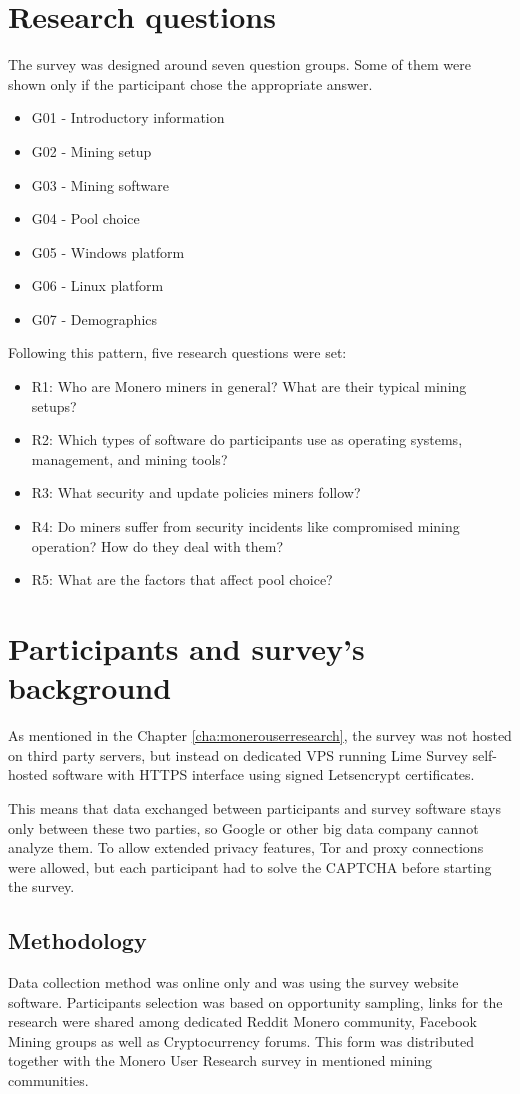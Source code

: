 \documentclass[
  printed, %
  table,   %
  lof,     %
  lot,     %
           oneside, color
]{fithesis3}
\begin{document}
\section{Research questions}
The survey was designed around seven question groups. Some of them were shown only if the participant chose the appropriate answer.
\begin{itemize}\itemsep0em
\item G01 - Introductory information
\item G02 - Mining setup
\item G03 - Mining software
\item G04 - Pool choice
\item G05 - Windows platform
\item G06 - Linux platform
\item G07 - Demographics
\end{itemize}
Following this pattern, five research questions were set:
\begin{itemize}\itemsep0em
\item R1: Who are Monero miners in general? What are their typical mining setups? 
\item R2: Which types of software do participants use as operating systems, management, and mining tools?
\item R3: What security and update policies miners follow? 
\item R4: Do miners suffer from security incidents like compromised mining operation? How do they deal with them?
\item R5: What are the factors that affect pool choice?
\end{itemize}
\section{Participants and survey's background}
As mentioned in the Chapter \ref{cha:monerouserresearch}, the survey was not hosted on third party servers, but instead on dedicated VPS running Lime Survey self-hosted software with HTTPS interface using signed Letsencrypt certificates.

This means that data exchanged between participants and survey software stays only between these two parties, so Google or other big data company cannot analyze them. To allow extended privacy features, Tor and proxy connections were allowed, but each participant had to solve the CAPTCHA before starting the survey.
\subsection{Methodology}
Data collection method was online only and was using the survey website software. Participants selection was based on opportunity sampling, links for the research were shared among dedicated Reddit Monero community, Facebook Mining groups as well as Cryptocurrency forums. This form was distributed together with the Monero User Research survey in mentioned mining communities.
\end{document}

